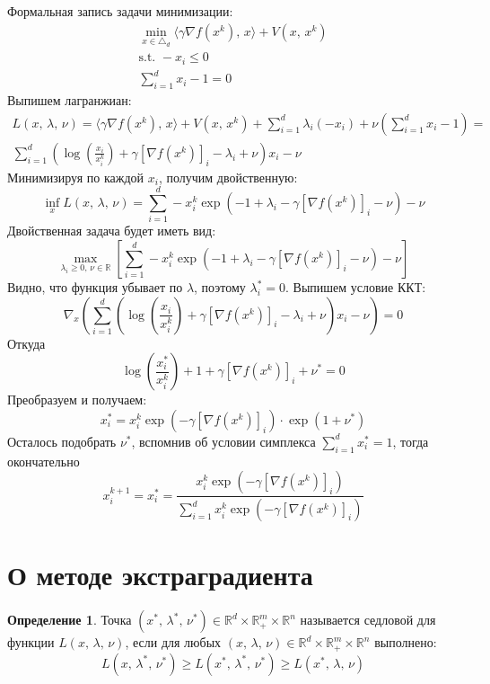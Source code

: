 \documentclass[a4paper,12pt]{article}
\renewcommand{\leq}{\ensuremath{\leqslant}}
\renewcommand{\geq}{\ensuremath{\geqslant}}
\theoremstyle{plain}
\theoremstyle{definition}
\newtheorem{definition}{Определение}[section]
\theoremstyle{remark}
\begin{document}
Формальная запись задачи минимизации:
\begin{align*}
	\min_{x \in \triangle_d} \langle \gamma\nabla f(x^k),\, x\rangle + V(x,\, x^k) \\
	\text{s.t. } -x_i \leq 0                                                       \\
	\sum_{i = 1}^d x_i - 1 = 0
\end{align*}
Выпишем лагранжиан:
\begin{align*}
	L(x,\, \lambda,\, \nu) = \langle \gamma\nabla f(x^k),\, x\rangle + V(x,\, x^k) + \sum_{i = 1}^d \lambda_i (-x_i) + \nu\left(\sum_{i = 1}^d x_i - 1\right) = \\
	\sum_{i = 1}^d\left(\log\left(\frac{x_i}{x_i^k}\right) + \gamma[\nabla f(x^k)]_i - \lambda_i + \nu\right)x_i - \nu
\end{align*}
Минимизируя по каждой $x_i$, получим двойственную:
\[
	\inf_xL(x,\, \lambda,\, \nu) = \sum_{i = 1}^d -x_i^k\exp(-1 + \lambda_i - \gamma[\nabla f(x^k)]_i - \nu) - \nu
\]
Двойственная задача будет иметь вид:
\[
	\max_{\lambda_i \geq 0,\, \nu \in \mathbb{R}} \left[\sum_{i = 1}^d -x_i^k\exp(-1 + \lambda_i - \gamma[\nabla f(x^k)]_i - \nu) - \nu\right]
\]
Видно, что функция убывает по $\lambda$, поэтому $\lambda_i^* = 0$. Выпишем условие ККТ:
\[
	\nabla_x\left(\sum_{i = 1}^d\left(\log\left(\frac{x_i}{x_i^k}\right) + \gamma[\nabla f(x^k)]_i - \lambda_i + \nu\right)x_i - \nu\right) = 0
\]
Откуда
\[
	\log\left(\frac{x_i^*}{x_i^k}\right) + 1 + \gamma[\nabla f(x^k)]_i + \nu^* = 0
\]
Преобразуем и получаем:
\[
	x_i^* = x_i^k\exp(-\gamma[\nabla f(x^k)]_i)\cdot\exp(1 + \nu^*)
\]
Осталось подобрать $\nu^*$, вспомнив об условии симплекса $\sum_{i = 1}^d x_i^* = 1$, тогда окончательно
\[
	x_i^{k + 1} = x_i^* = \frac{x_i^k\exp(-\gamma[\nabla f(x^k)]_i)}{\sum_{i = 1}^d x_i^k \exp(-\gamma[\nabla f(x^k)]_i)}
\]

\section{О методе экстраградиента}
\begin{definition}
	Точка $(x^*,\, \lambda^*,\, \nu^*) \in \mathbb{R}^d \times \mathbb{R}^m_+ \times \mathbb{R}^n$ называется седловой для функции $L(x,\, \lambda,\, \nu)$, если для любых $(x,\, \lambda,\, \nu) \in \mathbb{R}^d \times \mathbb{R}^m_+ \times \mathbb{R}^n$ выполнено:
	\[
		L(x,\, \lambda^*,\, \nu^*) \geq L(x^*,\, \lambda^*,\, \nu^*) \geq L(x^*,\, \lambda,\, \nu)
	\]
\end{definition}
\end{document}
